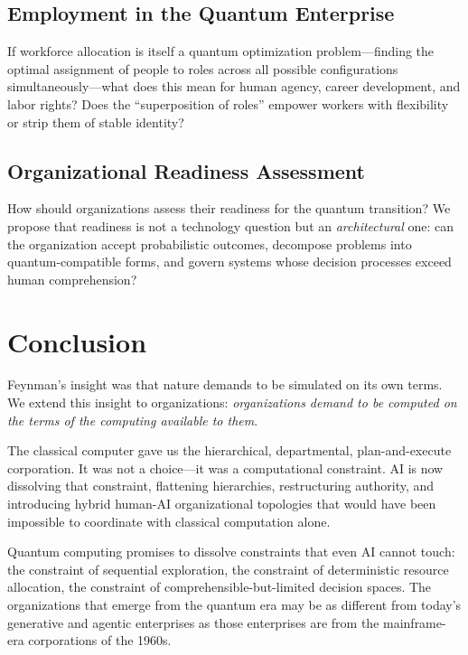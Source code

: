 \documentclass[11pt,a4paper,twocolumn]{article}
\begin{document}
\subsection{Employment in the Quantum Enterprise}

If workforce allocation is itself a quantum optimization problem---finding the optimal assignment of people to roles across all possible configurations simultaneously---what does this mean for human agency, career development, and labor rights? Does the ``superposition of roles'' empower workers with flexibility or strip them of stable identity?

\subsection{Organizational Readiness Assessment}

How should organizations assess their readiness for the quantum transition? We propose that readiness is not a technology question but an \textit{architectural} one: can the organization accept probabilistic outcomes, decompose problems into quantum-compatible forms, and govern systems whose decision processes exceed human comprehension?


\section{Conclusion}
\label{sec:conclusion}

Feynman's insight was that nature demands to be simulated on its own terms. We extend this insight to organizations: \textit{organizations demand to be computed on the terms of the computing available to them}.

The classical computer gave us the hierarchical, departmental, plan-and-execute corporation. It was not a choice---it was a computational constraint. AI is now dissolving that constraint, flattening hierarchies, restructuring authority, and introducing hybrid human-AI organizational topologies that would have been impossible to coordinate with classical computation alone.

Quantum computing promises to dissolve constraints that even AI cannot touch: the constraint of sequential exploration, the constraint of deterministic resource allocation, the constraint of comprehensible-but-limited decision spaces. The organizations that emerge from the quantum era may be as different from today's generative and agentic enterprises as those enterprises are from the mainframe-era corporations of the 1960s.
\end{document}
